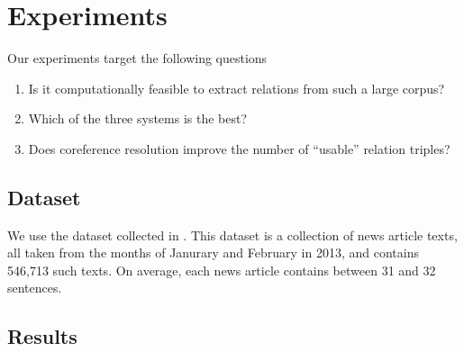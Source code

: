 \section{Experiments}

Our experiments target the following questions
\begin{enumerate}
\item Is it computationally feasible to extract relations from 
  such a large corpus?
\item Which of the three systems is the best?
\item Does coreference resolution improve the number of 
  ``usable'' relation triples?
\end{enumerate}

\subsection{Dataset}
We use the \newsspike{} dataset collected in \citet{zhang2013parallelparaphrase}.
This dataset is a collection of news article texts, all taken from the months of
Janurary and February in 2013, and contains 546,713 such texts. On average,
each news article contains between 31 and 32 sentences.

\subsection{Results}
 





